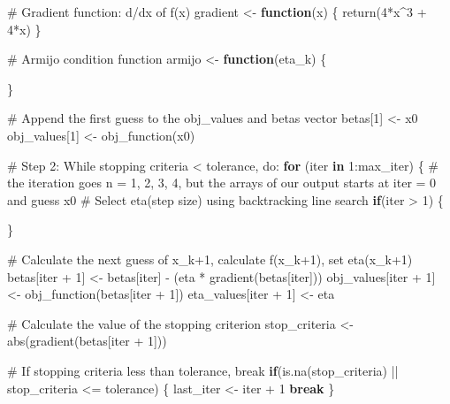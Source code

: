 \documentclass[
  letterpaper,
  DIV=11,
  numbers=noendperiod]{scrartcl}
\newenvironment{Shaded}{\begin{snugshade}}{\end{snugshade}}
\newcommand{\CommentTok}[1]{\textcolor[rgb]{0.37,0.37,0.37}{#1}}
\newcommand{\ControlFlowTok}[1]{\textcolor[rgb]{0.00,0.23,0.31}{\textbf{#1}}}
\newcommand{\DecValTok}[1]{\textcolor[rgb]{0.68,0.00,0.00}{#1}}
\newcommand{\FunctionTok}[1]{\textcolor[rgb]{0.28,0.35,0.67}{#1}}
\newcommand{\NormalTok}[1]{\textcolor[rgb]{0.00,0.23,0.31}{#1}}
\newcommand{\OtherTok}[1]{\textcolor[rgb]{0.00,0.23,0.31}{#1}}
\newcommand{\SpecialCharTok}[1]{\textcolor[rgb]{0.37,0.37,0.37}{#1}}
\begin{document}
\begin{Shaded}
\begin{Highlighting}[]
  \CommentTok{\# Gradient function: d/dx of f(x)}
\NormalTok{  gradient }\OtherTok{\textless{}{-}} \ControlFlowTok{function}\NormalTok{(x) \{}
    \FunctionTok{return}\NormalTok{(}\DecValTok{4}\SpecialCharTok{*}\NormalTok{x}\SpecialCharTok{\^{}}\DecValTok{3} \SpecialCharTok{+} \DecValTok{4}\SpecialCharTok{*}\NormalTok{x)}
\NormalTok{  \}}
  
  \CommentTok{\# Armijo condition function}
\NormalTok{  armijo }\OtherTok{\textless{}{-}} \ControlFlowTok{function}\NormalTok{(eta\_k) \{}
    
\NormalTok{  \}}
  
  \CommentTok{\# Append the first guess to the obj\_values and betas vector}
\NormalTok{  betas[}\DecValTok{1}\NormalTok{] }\OtherTok{\textless{}{-}}\NormalTok{ x0}
\NormalTok{  obj\_values[}\DecValTok{1}\NormalTok{] }\OtherTok{\textless{}{-}} \FunctionTok{obj\_function}\NormalTok{(x0)}
  
  \CommentTok{\# Step 2: While stopping criteria \textless{} tolerance, do:}
  \ControlFlowTok{for}\NormalTok{ (iter }\ControlFlowTok{in} \DecValTok{1}\SpecialCharTok{:}\NormalTok{max\_iter) \{ }\CommentTok{\# the iteration goes n = 1, 2, 3, 4, but the arrays of our output starts at iter = 0 and guess x0}
    \CommentTok{\# Select eta(step size) using backtracking line search}
    \ControlFlowTok{if}\NormalTok{(iter }\SpecialCharTok{\textgreater{}} \DecValTok{1}\NormalTok{) \{}
      
\NormalTok{    \}}
    
    \CommentTok{\# Calculate the next guess of x\_k+1, calculate f(x\_k+1), set eta(x\_k+1)}
\NormalTok{    betas[iter }\SpecialCharTok{+} \DecValTok{1}\NormalTok{] }\OtherTok{\textless{}{-}}\NormalTok{ betas[iter] }\SpecialCharTok{{-}}\NormalTok{ (eta }\SpecialCharTok{*} \FunctionTok{gradient}\NormalTok{(betas[iter]))}
\NormalTok{    obj\_values[iter }\SpecialCharTok{+} \DecValTok{1}\NormalTok{] }\OtherTok{\textless{}{-}} \FunctionTok{obj\_function}\NormalTok{(betas[iter }\SpecialCharTok{+} \DecValTok{1}\NormalTok{])}
\NormalTok{    eta\_values[iter }\SpecialCharTok{+} \DecValTok{1}\NormalTok{] }\OtherTok{\textless{}{-}}\NormalTok{ eta}
    
    \CommentTok{\# Calculate the value of the stopping criterion}
\NormalTok{    stop\_criteria }\OtherTok{\textless{}{-}} \FunctionTok{abs}\NormalTok{(}\FunctionTok{gradient}\NormalTok{(betas[iter }\SpecialCharTok{+} \DecValTok{1}\NormalTok{]))}
    
    \CommentTok{\# If stopping criteria less than tolerance, break}
    \ControlFlowTok{if}\NormalTok{(}\FunctionTok{is.na}\NormalTok{(stop\_criteria) }\SpecialCharTok{||}\NormalTok{ stop\_criteria }\SpecialCharTok{\textless{}=}\NormalTok{ tolerance) \{ }
\NormalTok{      last\_iter }\OtherTok{\textless{}{-}}\NormalTok{ iter }\SpecialCharTok{+} \DecValTok{1}
      \ControlFlowTok{break} 
\NormalTok{    \}}
    

\end{Highlighting}
\end{Shaded}
\end{document}
